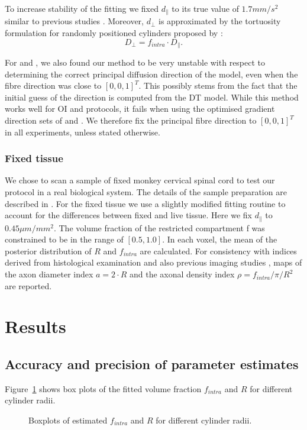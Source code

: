 To increase stability of the fitting we fixed $d_\parallel$ to its true value of $1.7mm/s^2$ similar to previous studies \citep{Assaf:2008,Barazany:2009,Alexander:2010}. Moreover, $d_\bot$ is approximated by the tortuosity formulation for randomly positioned cylinders proposed by \citet{Szafer:1995}:
\begin{equation}
    D_{\bot} = f_{intra}\cdot D_{\parallel}.
\end{equation}


For {\DO} and {\FD}, we also found our method to be very unstable with respect to determining the correct principal diffusion direction of the model, even when the fibre direction was close to $[0,0,1]^T$. This possibly stems from the fact that the initial guess of the direction is computed from the \gls{DT} model. While this method works well for {\gls{OI}} and {\SD} protocols, it fails when using the optimised gradient direction sets of {\DO} and {\FD}. We therefore fix the principal fibre direction to $[0,0,1]^T$ in all experiments, unless stated otherwise.

\subsubsection{Fixed tissue}
We chose to scan a sample of fixed monkey cervical spinal cord to test our protocol in a real biological system. The details of the sample preparation are described in \citep{Lundell:2011}. For the fixed tissue we use a slightly modified fitting routine to account for the differences between fixed and live tissue. Here we fix $d_{\|}$ to $0.45\mu m/mm^2$. The volume fraction of the restricted compartment f was constrained to be in the range of $[0.5, 1.0]$. In each voxel, the mean of the posterior distribution of $R$ and $f_{intra}$ are calculated. For consistency with indices derived from histological examination \citep{Keyserlingk:1984,LaMantia:1990a,Aboitiz:1992} and also previous imaging studies \citep{Alexander:2010}, maps of the axon diameter index $a=2\cdot R$ and the axonal density index $\rho=f_{intra}/\pi/R^2$ are reported.

\FloatBarrier

\section{Results}
\subsection{Accuracy and precision of parameter estimates}
Figure~\ref{fig:chapter7 exp1 boxplots 60mT} shows box plots of the fitted volume fraction $f_{intra}$ and $R$ for different cylinder radii.
\begin{figure}[H]
	\centering
	
	
	\caption{Boxplots of estimated $f_{intra}$ and $R$ for different cylinder radii.}
	\label{fig:chapter7 exp1 boxplots 60mT}
\end{figure}


